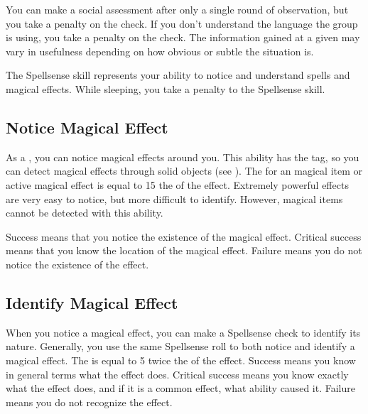        You can make a social assessment after only a single round of observation, but you take a  penalty on the check.
        If you don't understand the language the group is using, you take a  penalty on the check.
        The information gained at a given  may vary in usefulness depending on how obvious or subtle the situation is.

\newpage
{}
        The Spellsense skill represents your ability to notice and understand spells and magical effects.
        While sleeping, you take a  penalty to the Spellsense skill.


    \subsection{Notice Magical Effect}
        As a , you can notice magical effects around you.
        This ability has the  tag, so you can detect magical effects through solid objects (see ).
        The  for an  magical item or active magical effect is equal to 15 \sub the  of the effect.
        Extremely powerful effects are very easy to notice, but more difficult to identify.
        However,  magical items cannot be detected with this ability.

        Success means that you notice the existence of the magical effect.
        Critical success means that you know the location of the magical effect.
        Failure means you do not notice the existence of the effect.
        
    \subsection{Identify Magical Effect}
        When you notice a magical effect, you can make a Spellsense check to identify its nature.
        Generally, you use the same Spellsense roll to both notice and identify a magical effect.
        The  is equal to 5 \add twice the  of the effect.
        Success means you know in general terms what the effect does.
        Critical success means you know exactly what the effect does, and if it is a common effect, what ability caused it.
        Failure means you do not recognize the effect.

